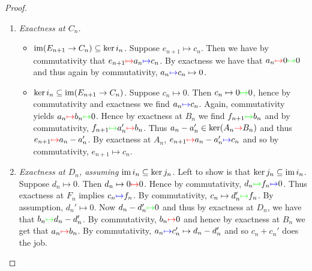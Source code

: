 \begin{proof}
	\begin{enumerate}[label = \textit{Step \arabic*:}, wide = 0pt]
		\item \textit{Exactness at $C_n$.} 
			\begin{itemize}[wide = 0pt]
				\item $\operatorname{im}(E_{n + 1} \to C_n) \subseteq \ker i_n$. Suppose $e_{n + 1} \mapsto c_n$. Then we have by commutativity that $e_{n + 1} \textcolor{red}{\mapsto} a_n \textcolor{blue}{\mapsto} c_n$. By exactness we have that $a_n \textcolor{red}{\mapsto} 0 \textcolor{green}{\mapsto} 0$ and thus again by commutativity, $a_n \textcolor{blue}{\mapsto} c_n \mapsto 0$. 
				\item $\ker i_n \subseteq \operatorname{im} (E_{n + 1} \to C_n)$. Suppose $c_n \mapsto 0$. Then $c_n \mapsto 0 \textcolor{green}{\mapsto} 0$, hence by commutativity and exactness we find $a_n \textcolor{blue}{\mapsto} c_n$. Again, commutativity yields $a_n \textcolor{red}{\mapsto} b_n \textcolor{green}{\mapsto} 0$. Hence by exactness at $B_n$ we find $f_{n + 1} \textcolor{green}{\mapsto} b_n$ and by commutativity, $f_{n + 1} \textcolor{green}{\mapsto} a_n' \textcolor{red}{\mapsto} b_n$. Thus $a_n - a_n' \in \ker(A_n \textcolor{red}{\to} B_n)$ and thus $e_{n + 1} \textcolor{red}{\mapsto} a_n - a_n'$. By exactness at $A_n$, $e_{n + 1} \textcolor{red}{\mapsto} a_n - a_n' \textcolor{blue}{\mapsto} c_n$ and so by commutativity, $e_{n + 1} \mapsto c_n$. 
			\end{itemize}
		\item \textit{Exactness at $D_n$, assuming $\operatorname{im} i_n \subseteq \ker j_n$.} Left to show is that $\ker j_n \subseteq \operatorname{im} i_n$. Suppose $d_n \mapsto 0$. Then $d_n\mapsto 0 \textcolor{red}{\mapsto} 0$. Hence by commutativity, $d_n \textcolor{green}{\mapsto} f_n \textcolor{blue}{\mapsto} 0$. Thus exactness at $F_n$ implies $c_n \textcolor{blue}{\mapsto} f_n$. By commutativity, $c_n \mapsto d_n' \textcolor{green}{\mapsto} f_n$. By assumption, $d_n' \mapsto 0$. Now $d_n - d_n' \textcolor{green}{\mapsto} 0$ and thus by exactness at $D_n$, we have that $b_n \textcolor{green}{\mapsto} d_n - d_n'$. By commutativity, $b_n \textcolor{red}{\mapsto} 0$ and hence by exactness at $B_n$ we get that $a_n \textcolor{red}{\mapsto} b_n$. By commutativity, $a_n \textcolor{blue}{\mapsto} c_n' \mapsto d_n - d_n'$ and so $c_n + c_n'$ does the job.

\end{enumerate}
\end{proof}
